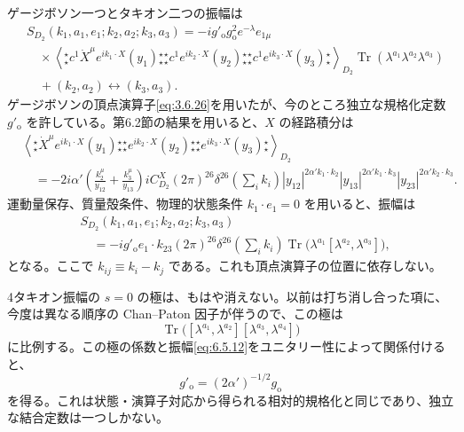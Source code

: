 
ゲージボソン一つとタキオン二つの振幅は
\begin{equation}
\begin{aligned}
&S_{D_2}(k_1,a_1,e_1;k_2,a_2;k_3,a_3)
=-ig'_{\mathrm o}g_{\mathrm o}^2e^{-\lambda}e_{1\mu}\\
&\quad\times
\left\langle
{}^\star_\star c^1\dot X^\mu e^{ik_1\cdot X}(y_1){}^\star_\star
{}^\star_\star c^1 e^{ik_2\cdot X}(y_2){}^\star_\star
{}^\star_\star c^1 e^{ik_3\cdot X}(y_3){}^\star_\star
\right\rangle_{D_2}
\operatorname{Tr}(\lambda^{a_1}\lambda^{a_2}\lambda^{a_3})\\
&\quad+(k_2,a_2)\leftrightarrow(k_3,a_3).
\end{aligned}
\tag{6.5.10}\label{eq:6.5.10}
\end{equation}
ゲージボソンの頂点演算子\eqref{eq:3.6.26}を用いたが、今のところ独立な規格化定数 $g'_{\mathrm o}$ を許している。第6.2節の結果を用いると、$X$ の経路積分は
\begin{equation}
\begin{aligned}
&\left\langle
{}^\star_\star\dot X^\mu e^{ik_1\cdot X}(y_1){}^\star_\star
{}^\star_\star e^{ik_2\cdot X}(y_2){}^\star_\star
{}^\star_\star e^{ik_3\cdot X}(y_3){}^\star_\star
\right\rangle_{D_2}\\
&\quad=-2i\alpha'\left(\frac{k_2^\mu}{y_{12}}+\frac{k_3^\mu}{y_{13}}\right)
iC^X_{D_2}(2\pi)^{26}\delta^{26}\left(\sum_i k_i\right)
|y_{12}|^{2\alpha'k_1\cdot k_2}
|y_{13}|^{2\alpha'k_1\cdot k_3}
|y_{23}|^{2\alpha'k_2\cdot k_3}.
\end{aligned}
\tag{6.5.11}\label{eq:6.5.11}
\end{equation}
運動量保存、質量殻条件、物理的状態条件 $k_1\cdot e_1=0$ を用いると、振幅は
\begin{equation}
\begin{aligned}
&S_{D_2}(k_1,a_1,e_1;k_2,a_2;k_3,a_3)\\
&\quad=-ig'_{\mathrm o}e_1\cdot k_{23}(2\pi)^{26}
\delta^{26}\left(\sum_i k_i\right)
\operatorname{Tr}\bigl(\lambda^{a_1}[\lambda^{a_2},\lambda^{a_3}]\bigr),
\end{aligned}
\tag{6.5.12}\label{eq:6.5.12}
\end{equation}
となる。ここで $k_{ij}\equiv k_i-k_j$ である。これも頂点演算子の位置に依存しない。

4タキオン振幅の $s=0$ の極は、もはや消えない。以前は打ち消し合った項に、今度は異なる順序の Chan--Paton 因子が伴うので、この極は
\begin{equation}
\operatorname{Tr}\bigl([\lambda^{a_1},\lambda^{a_2}]
[\lambda^{a_3},\lambda^{a_4}]\bigr)
\tag{6.5.13}\label{eq:6.5.13}
\end{equation}
に比例する。この極の係数と振幅\eqref{eq:6.5.12}をユニタリー性によって関係付けると、
\begin{equation}
g'_{\mathrm o}=(2\alpha')^{-1/2}g_{\mathrm o}
\tag{6.5.14}\label{eq:6.5.14}
\end{equation}
を得る。これは状態・演算子対応から得られる相対的規格化と同じであり、独立な結合定数は一つしかない。

